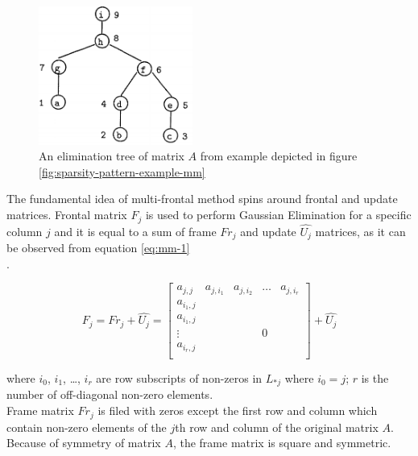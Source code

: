 \figpointer{\ref{fig:elimination-tree-mm}}

\begin{figure}[htpb]
  \centering
  \includegraphics[width=0.45\textwidth]{figures/chapter-2/elimination-tree-mm.png}
\caption{An elimination tree of matrix $A$ from example depicted in figure \ref{fig:sparsity-pattern-example-mm}
 \cite{mult-frontal-original:2}}
\label{fig:elimination-tree-mm}
\end{figure}


The fundamental idea of multi-frontal method spins around frontal and update matrices. Frontal matrix $F_{j}$ is used to perform Gaussian Elimination for a specific column $j$ and it is equal to a sum of  frame $Fr_{j}$ and update $\hat{U_{j}}$ matrices, as it can be observed from equation \ref{eq:mm-1}\\.

\begin{equation} \label{eq:mm-1}
	F_{j} = Fr_{j} + \hat{U_{j}} = \begin{bmatrix}a_{j,j} & a_{j,i_1} & a_{j,i_2} & \dots & a_{j,i_r} \\
a_{i_1,j} \\
a_{i_1,j} \\
\vdots & & & 0\\
a_{i_r,j} \\
\end{bmatrix} + \hat{U_{j}}
\end{equation}

where $i_{0}$, $i_{1}$, \dots , $i_{r}$ are row subscripts of non-zeros in $L_{*j}$ where $i_{0} = j$; $r$ is the number of off-diagonal non-zero elements.\\

Frame matrix $Fr_{j}$ is filed with zeros except the first row and column which contain non-zero elements of the $j$th row and column of the original matrix $A$. Because of symmetry of matrix $A$, the frame matrix is square and symmetric.\\

